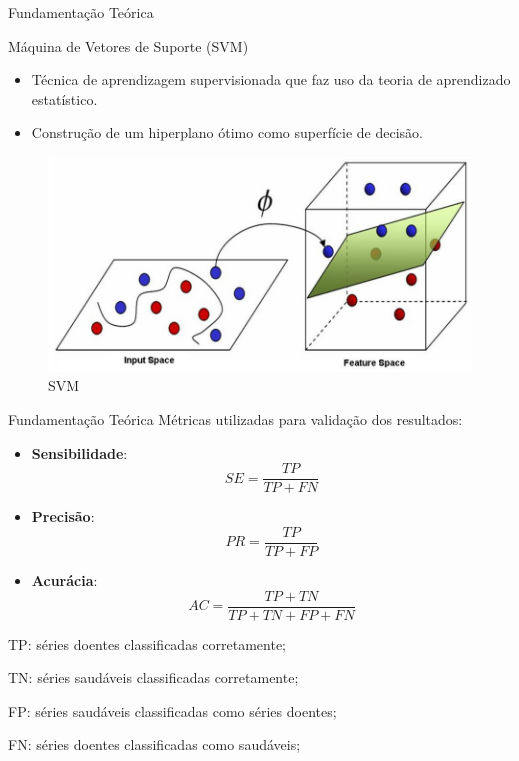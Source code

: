 \documentclass[apesctratio=169]{beamer}
\begin{document}
	   \begin{frame}{Fundamentação Teórica}
	        
	        \begin{block}{Máquina de Vetores de Suporte (SVM)}
	             \begin{itemize}
	                 \item Técnica de aprendizagem supervisionada que faz uso da teoria de aprendizado estatístico.
	                 \item Construção de um hiperplano ótimo como superfície de decisão.
	            \end{itemize}
	        \end{block}
            
	        \begin{figure}[H]
    			     \includegraphics[scale=0.5]{svm.PNG}
    			     \caption{SVM}
    		\end{figure}
	   \end{frame}
	   
	   \begin{frame}{Fundamentação Teórica}
	   Métricas utilizadas para validação dos resultados:
	           \begin{itemize}
	               \item \textbf{Sensibilidade}: $$SE = \dfrac{TP}{TP+FN}$$
	               \item \textbf{Precisão}: $$PR = \dfrac{TP}{TP+FP}$$
	               \item \textbf{Acurácia}: $$AC = \dfrac{TP+TN}{TP+TN+FP+FN}$$
	           \end{itemize}
	       
        TP: séries doentes classificadas corretamente;
                    
        TN: séries saudáveis classificadas corretamente;
                    
        FP: séries saudáveis classificadas como séries doentes;
                    
        FN: séries doentes classificadas como saudáveis;

	   \end{frame}
    
\end{document}
